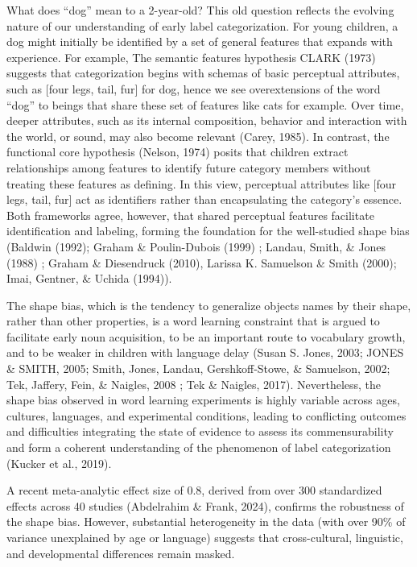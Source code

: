 \documentclass[10pt, letterpaper]{article}
\begin{document}
What does ``dog'' mean to a 2-year-old? This old question reflects the
evolving nature of our understanding of early label categorization. For
young children, a dog might initially be identified by a set of general
features that expands with experience. For example, The semantic
features hypothesis CLARK (1973) suggests that categorization begins
with schemas of basic perceptual attributes, such as {[}four legs, tail,
fur{]} for dog, hence we see overextensions of the word ``dog'' to
beings that share these set of features like cats for example. Over
time, deeper attributes, such as its internal composition, behavior and
interaction with the world, or sound, may also become relevant (Carey,
1985). In contrast, the functional core hypothesis (Nelson, 1974) posits
that children extract relationships among features to identify future
category members without treating these features as defining. In this
view, perceptual attributes like {[}four legs, tail, fur{]} act as
identifiers rather than encapsulating the category's essence. Both
frameworks agree, however, that shared perceptual features facilitate
identification and labeling, forming the foundation for the well-studied
shape bias (Baldwin (1992); Graham \& Poulin-Dubois (1999) ; Landau,
Smith, \& Jones (1988) ; Graham \& Diesendruck (2010), Larissa K.
Samuelson \& Smith (2000); Imai, Gentner, \& Uchida (1994)).

The shape bias, which is the tendency to generalize objects names by
their shape, rather than other properties, is a word learning constraint
that is argued to facilitate early noun acquisition, to be an important
route to vocabulary growth, and to be weaker in children with language
delay (Susan S. Jones, 2003; JONES \& SMITH, 2005; Smith, Jones, Landau,
Gershkoff-Stowe, \& Samuelson, 2002; Tek, Jaffery, Fein, \& Naigles,
2008 ; Tek \& Naigles, 2017). Nevertheless, the shape bias observed in
word learning experiments is highly variable across ages, cultures,
languages, and experimental conditions, leading to conflicting outcomes
and difficulties integrating the state of evidence to assess its
commensurability and form a coherent understanding of the phenomenon of
label categorization (Kucker et al., 2019).

A recent meta-analytic effect size of 0.8, derived from over 300
standardized effects across 40 studies (Abdelrahim \& Frank, 2024),
confirms the robustness of the shape bias. However, substantial
heterogeneity in the data (with over 90\% of variance unexplained by age
or language) suggests that cross-cultural, linguistic, and developmental
differences remain masked.
\end{document}
